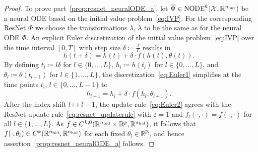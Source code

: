 \documentclass[10pt]{article}
\theoremstyle{definition}
\numberwithin{equation}{section}
\newcommand{\eps}{\varepsilon}
\newcommand{\R}{\mathbb{R}}
\newcommand*{\nout}{n_\textup{out}}
\newcommand*{\nhid}{n_\textup{hid}}
\newcommand*{\NODE}{\textup{NODE}^k(\mathcal{X},\R^{\nout})}
\begin{document}
\begin{proof}
    To prove part~\ref{prop:resnet_neuralODE_a}, let $\overline{\Phi} \in \NODE$ be a neural ODE based on the initial value problem~\eqref{eq:IVP}. For the corresponding ResNet $\Phi$ we choose the transformations $\lambda$, $\tilde{\lambda}$ to be the same as for the neural ODE $\overline{\Phi}$. An explicit Euler discretization of the initial value problem~\eqref{eq:IVP} over the time interval $[0,T]$ with step size $\delta \coloneqq \frac{T}{L}$ results in
    \begin{equation}\label{eq:Euler1}
        h(t + \delta) = h(t) + \delta \cdot f(h(t),\theta(t)).
    \end{equation}
    By defining $t_l \coloneqq l \delta$ for $l \in \{0,\ldots,L\}$, $h_l \coloneqq h(t_l)$ for $l \in \{0,\ldots, L\}$, and $\theta_l \coloneqq \theta(t_{l-1})$ for $l \in \{1,\ldots, L\}$, the discretization~\eqref{eq:Euler1} simplifies at the time points $t_l$, $l \in \{0,\ldots,L-1\}$ to
    \begin{equation} \label{eq:Euler2} 
        h_{l+1} = h_{l} + \delta \cdot f(h_{l},\theta_{l+1}).
    \end{equation}
    After the index shift $l \mapsto l-1$, the update rule~\eqref{eq:Euler2} agrees with the ResNet update rule~\eqref{eq:resnet_updaterule} with $\eps = 1$ and $f_l(\cdot,\cdot) = f(\cdot,\cdot)$ for all $l \in \{1,\ldots,L\}$. As $f\in C^{k,0}(\R^{\nhid}\times \R^p,\R^{\nhid})$, it follows that $f(\cdot,\theta_l)\in C^{k}(\R^{\nhid},\R^{\nhid})$ for each fixed $\theta_l\in \R^{p_l}$, and hence assertion~\ref{prop:resnet_neuralODE_a} follows.
    

\end{proof}
\end{document}
